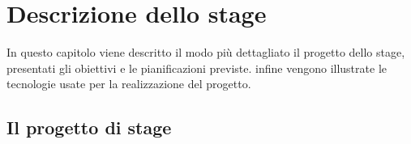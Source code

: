
\chapter{Descrizione dello stage}
\label{cap:processi-metodologie}

In questo capitolo viene descritto il modo più dettagliato il progetto dello stage, presentati gli obiettivi e le pianificazioni previste. infine vengono illustrate le tecnologie usate per la realizzazione del progetto. 

\section{Il progetto di stage}

